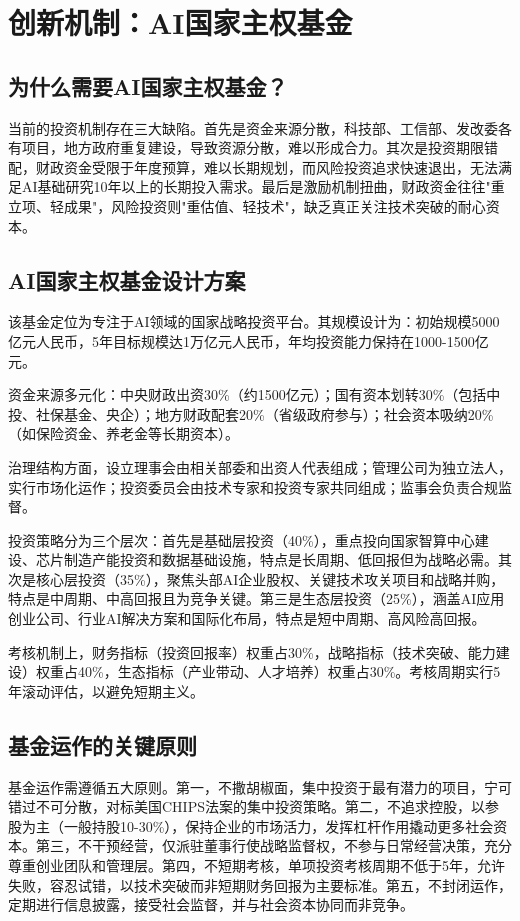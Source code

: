 \section{创新机制：AI国家主权基金}

\subsection{为什么需要AI国家主权基金？}

当前的投资机制存在三大缺陷。首先是资金来源分散，科技部、工信部、发改委各有项目，地方政府重复建设，导致资源分散，难以形成合力。其次是投资期限错配，财政资金受限于年度预算，难以长期规划，而风险投资追求快速退出，无法满足AI基础研究10年以上的长期投入需求。最后是激励机制扭曲，财政资金往往"重立项、轻成果"，风险投资则"重估值、轻技术"，缺乏真正关注技术突破的耐心资本。

\subsection{AI国家主权基金设计方案}

该基金定位为专注于AI领域的国家战略投资平台。其规模设计为：初始规模5000亿元人民币，5年目标规模达1万亿元人民币，年均投资能力保持在1000-1500亿元。

资金来源多元化：中央财政出资30\%（约1500亿元）；国有资本划转30\%（包括中投、社保基金、央企）；地方财政配套20\%（省级政府参与）；社会资本吸纳20\%（如保险资金、养老金等长期资本）。

治理结构方面，设立理事会由相关部委和出资人代表组成；管理公司为独立法人，实行市场化运作；投资委员会由技术专家和投资专家共同组成；监事会负责合规监督。

投资策略分为三个层次：首先是基础层投资（40\%），重点投向国家智算中心建设、芯片制造产能投资和数据基础设施，特点是长周期、低回报但为战略必需。其次是核心层投资（35\%），聚焦头部AI企业股权、关键技术攻关项目和战略并购，特点是中周期、中高回报且为竞争关键。第三是生态层投资（25\%），涵盖AI应用创业公司、行业AI解决方案和国际化布局，特点是短中周期、高风险高回报。

考核机制上，财务指标（投资回报率）权重占30\%，战略指标（技术突破、能力建设）权重占40\%，生态指标（产业带动、人才培养）权重占30\%。考核周期实行5年滚动评估，以避免短期主义。

\subsection{基金运作的关键原则}

基金运作需遵循五大原则。第一，不撒胡椒面，集中投资于最有潜力的项目，宁可错过不可分散，对标美国CHIPS法案的集中投资策略。第二，不追求控股，以参股为主（一般持股10-30\%），保持企业的市场活力，发挥杠杆作用撬动更多社会资本。第三，不干预经营，仅派驻董事行使战略监督权，不参与日常经营决策，充分尊重创业团队和管理层。第四，不短期考核，单项投资考核周期不低于5年，允许失败，容忍试错，以技术突破而非短期财务回报为主要标准。第五，不封闭运作，定期进行信息披露，接受社会监督，并与社会资本协同而非竞争。

